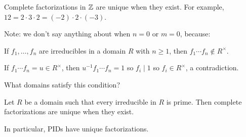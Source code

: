 \documentclass[12pt,letterpaper]{report}
\begin{document}
\begin{ex}
  Complete factorizations in $\mathbb{Z}$ are unique when they exist.
  For example, $12 = 2 \cdot 3 \cdot 2 = (-2) \cdot 2 \cdot (-3)$.
\end{ex}

Note: we don't say anything about when $n = 0$ or $m = 0$, because:

\begin{lem}{}{}
  If $f_1, \ldots, f_n$ are irreducibles in a domain $R$ with $n \geq 1$, then
  $f_1 \cdots f_n \not\in R^\times$.
\end{lem}

\begin{thmproof}
  If $f_1 \cdots f_n = u \in R^\times$, then $u^{-1}f_1 \cdots f_n = 1$ so $f_i \mid 1$ so
  $f_i \in R^\times$, a contradiction.
\end{thmproof}

What domains satisfy this condition?

\begin{prop}{}{}
  Let $R$ be a domain such that every irreducible in $R$ is prime.
  Then complete factorizations are unique when they exist.
\end{prop}

In particular, PIDs have unique factorizations.
\end{document}
